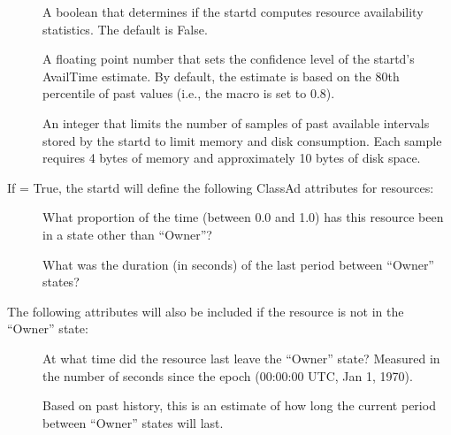 \begin{description}

\item[]
\label{param:StartdComputeAvailStats}
  A boolean that determines if the startd computes resource
  availability statistics.  The default is False.

\item[]
\label{param:StartdAvailConfidence}
  A floating point number that sets the confidence level of the
  startd's AvailTime estimate.  By default, the estimate is based on
  the 80th percentile of past values (i.e., the macro is set to 0.8).

\item[]
\label{param:StartdMaxAvailPeriodSamples}
  An integer that limits the number of samples of past available
  intervals stored by the startd to limit memory and disk consumption.
  Each sample requires 4 bytes of memory and approximately 10 bytes of
  disk space.

\end{description}

If  = True, the startd will
define the following ClassAd attributes for resources:

\begin{description}
\item[]
  What proportion of the time (between 0.0 and 1.0)
  has this resource been in a state other than ``Owner''?
\item[]
  What was the duration (in seconds) of the
  last period between ``Owner'' states?
\end{description}

The following attributes will also be included if the resource is
not in the ``Owner'' state:

\begin{description}
\item[]
  At what time did the resource last leave the
  ``Owner'' state?  Measured in the number of seconds since the
  epoch (00:00:00 UTC, Jan 1, 1970).
\item[]
  Based on past history, this is an estimate
  of how long the current period between ``Owner'' states will
  last.
\end{description}


